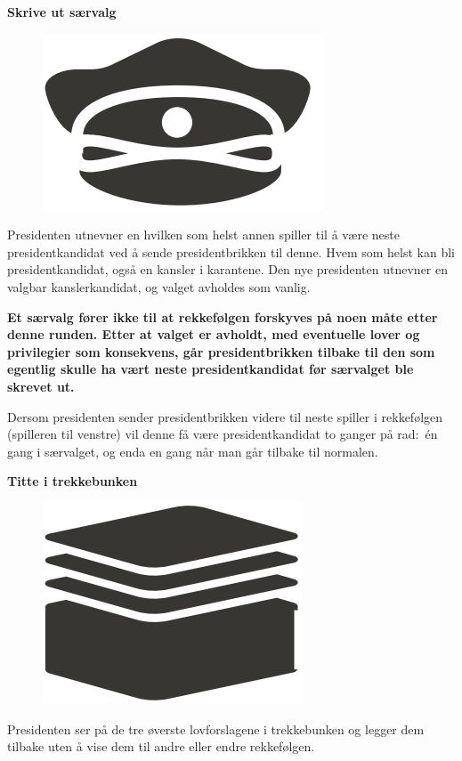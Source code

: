\documentclass[a4paper, 10pt, twocolumn, twoside]{article}
\begin{document}
\textbf{Skrive ut særvalg}\\
\begin{figure}
\includegraphics[width=\linewidth]{./graphics/hitler_hatt}
\end{figure}
Presidenten utnevner en hvilken som helst annen spiller til å være neste presidentkandidat ved å sende presidentbrikken til denne. Hvem som helst kan bli presidentkandidat, også en kansler i karantene. Den nye presidenten utnevner en valgbar kanslerkandidat, og valget avholdes som vanlig.

\textbf{Et særvalg fører ikke til at rekkefølgen forskyves på noen måte etter denne runden. Etter at valget er avholdt, med eventuelle lover og privilegier som konsekvens, går presidentbrikken tilbake til den som egentlig skulle ha vært neste presidentkandidat før særvalget ble skrevet ut.}

Dersom presidenten sender presidentbrikken videre til neste spiller i rekkefølgen (spilleren til venstre) vil denne få være presidentkandidat to ganger på rad:\ én gang i særvalget, og enda en gang når man går tilbake til normalen.

\textbf{Titte i trekkebunken}\\
\begin{figure}
\includegraphics[width=\linewidth]{./graphics/hitler_bunke}
\end{figure}
Presidenten ser på de tre øverste lovforslagene i trekkebunken og legger dem tilbake uten å vise dem til andre eller endre rekkefølgen.
\end{document}
